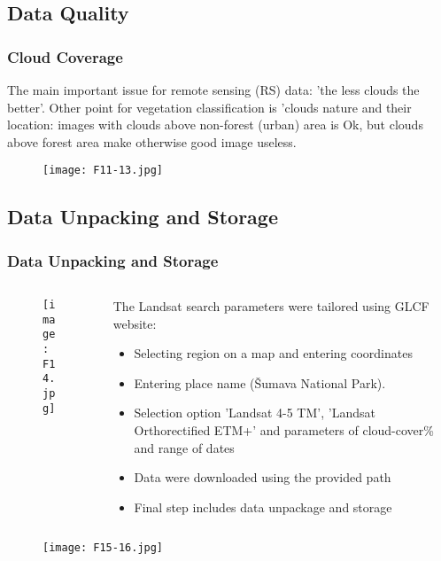 \documentclass[pdflatex,compress,8pt,
	xcolor={dvipsnames,dvipsnames,svgnames,x11names,table},
	hyperref={
	breaklinks = true, 
	pdfauthor={Lemenkova Polina}, 
	pdfsubject={Preentation}, 
	pdfcreator={Lemenkova Polina}, 
	pdfproducer={Lemenkova Polina}, 
	colorlinks=true,linkcolor=blue, 
	citecolor=NavyBlue, 
	urlcolor = NavyBlue, 
	breaklinks = true}]{beamer}
\begin{document}
\subsection{Data Quality}
\begin{frame}\frametitle{Cloud Coverage}
The main important issue for remote sensing (RS) data: 'the less clouds the better'.
Other point for vegetation classification is 'clouds nature and their location: images with clouds above non-forest (urban) area is Ok, but clouds above forest area make otherwise good image useless.
\begin{figure}[H]
	\centering
		\texttt{[image: F11-13.jpg]}
\end{figure}
\end{frame}

\subsection{Data Unpacking and Storage}
\begin{frame}\frametitle{Data Unpacking and Storage}
\begin{minipage}[0.4\textheight]{\textwidth}
\begin{columns}[T]
\begin{column}{0.4\textwidth}
\vspace{1em}
\begin{figure}[H]
	\centering
		\texttt{[image: F14.jpg]}
\end{figure}
\end{column}
\begin{column}{0.6\textwidth}
\vspace{1em} 
\small{The Landsat search parameters were tailored using GLCF website:
\begin{itemize}
	\item Selecting region on a map and entering coordinates
	\item Entering place name (Šumava National Park). 
	\item Selection option 'Landsat 4-5 TM', 'Landsat Orthorectified ETM+' and parameters of cloud-cover\% and range of  dates
	\item Data were downloaded using the provided path
	\item Final step includes data unpackage and storage
\end{itemize}}
\end{column}
\end{columns}
\end{minipage}
\begin{figure}[H]
	\centering
		\texttt{[image: F15-16.jpg]}
\end{figure}
\end{frame}
\end{document}
